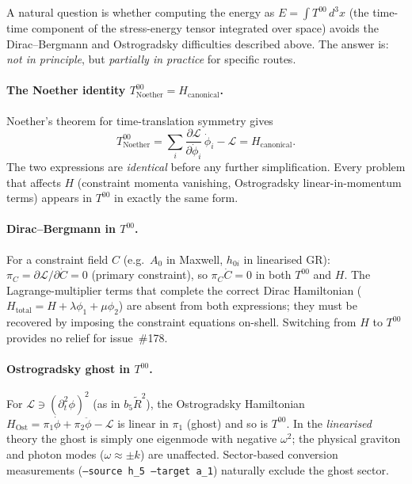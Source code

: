 A natural question is whether computing the energy as
$E = \int T^{00}\,d^3x$ (the time-time component of the stress-energy tensor
integrated over space) avoids the Dirac--Bergmann and Ostrogradsky difficulties
described above.  The answer is: \emph{not in principle}, but \emph{partially in
practice} for specific routes.

\paragraph{The Noether identity $T^{00}_{\mathrm{Noether}} = H_{\mathrm{canonical}}$.}
Noether's theorem for time-translation symmetry gives
\[
  T^{00}_{\mathrm{Noether}}
  = \sum_i \frac{\partial\mathcal{L}}{\partial\dot\phi_i}\,\dot\phi_i - \mathcal{L}
  = H_{\mathrm{canonical}}.
\]
The two expressions are \emph{identical} before any further simplification.
Every problem that affects $H$ (constraint momenta vanishing, Ostrogradsky
linear-in-momentum terms) appears in $T^{00}$ in exactly the same form.

\paragraph{Dirac--Bergmann in $T^{00}$.}
For a constraint field $C$ (e.g.\ $A_0$ in Maxwell, $h_{0i}$ in linearised GR):
$\pi_C = \partial\mathcal{L}/\partial\dot C = 0$ (primary constraint), so
$\pi_C\dot C = 0$ in both $T^{00}$ and $H$.  The Lagrange-multiplier terms that
complete the correct Dirac Hamiltonian ($H_{\mathrm{total}} = H + \lambda\phi_1
+ \mu\phi_2$) are absent from both expressions; they must be recovered by
imposing the constraint equations on-shell.  Switching from $H$ to $T^{00}$
provides no relief for issue~\#178.

\paragraph{Ostrogradsky ghost in $T^{00}$.}
For $\mathcal{L} \ni (\partial^2_t\phi)^2$ (as in $b_5\tilde R^2$), the
Ostrogradsky Hamiltonian $H_{\mathrm{Ost}} = \pi_1\dot\phi + \pi_2\ddot\phi - \mathcal{L}$
is linear in $\pi_1$ (ghost) and so is $T^{00}$.  In the \emph{linearised}
theory the ghost is simply one eigenmode with negative $\omega^2$; the physical
graviton and photon modes ($\omega \approx \pm k$) are unaffected.  Sector-based
conversion measurements (\texttt{--source h\_5 --target a\_1}) naturally exclude
the ghost sector.

